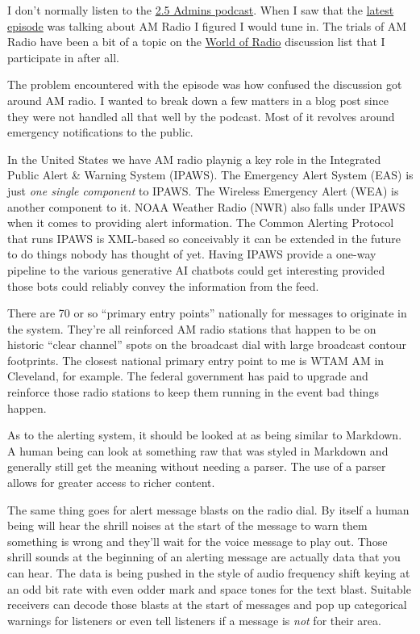 I don't normally listen to the \href{https://2.5admins.com/}{2.5 Admins
podcast}. When I saw that the
\href{https://2.5admins.com/2-5-admins-144}{latest episode} was talking
about AM Radio I figured I would tune in. The trials of AM Radio have
been a bit of a topic on the \href{http://www.worldofradio.com/}{World
of Radio} discussion list that I participate in after all.

The problem encountered with the episode was how confused the discussion
got around AM radio. I wanted to break down a few matters in a blog post
since they were not handled all that well by the podcast. Most of it
revolves around emergency notifications to the public.

In the United States we have AM radio playnig a key role in the
Integrated Public Alert \& Warning System (IPAWS). The Emergency Alert
System (EAS) is just \emph{one single component} to IPAWS. The Wireless
Emergency Alert (WEA) is another component to it. NOAA Weather Radio
(NWR) also falls under IPAWS when it comes to providing alert
information. The Common Alerting Protocol that runs IPAWS is XML-based
so conceivably it can be extended in the future to do things nobody has
thought of yet. Having IPAWS provide a one-way pipeline to the various
generative AI chatbots could get interesting provided those bots could
reliably convey the information from the feed.

There are 70 or so ``primary entry points'' nationally for messages to
originate in the system. They're all reinforced AM radio stations that
happen to be on historic ``clear channel'' spots on the broadcast dial
with large broadcast contour footprints. The closest national primary
entry point to me is WTAM AM in Cleveland, for example. The federal
government has paid to upgrade and reinforce those radio stations to
keep them running in the event bad things happen.

As to the alerting system, it should be looked at as being similar to
Markdown. A human being can look at something raw that was styled in
Markdown and generally still get the meaning without needing a parser.
The use of a parser allows for greater access to richer content.

The same thing goes for alert message blasts on the radio dial. By
itself a human being will hear the shrill noises at the start of the
message to warn them something is wrong and they'll wait for the voice
message to play out. Those shrill sounds at the beginning of an alerting
message are actually data that you can hear. The data is being pushed in
the style of audio frequency shift keying at an odd bit rate with even
odder mark and space tones for the text blast. Suitable receivers can
decode those blasts at the start of messages and pop up categorical
warnings for listeners or even tell listeners if a message is \emph{not}
for their area.

